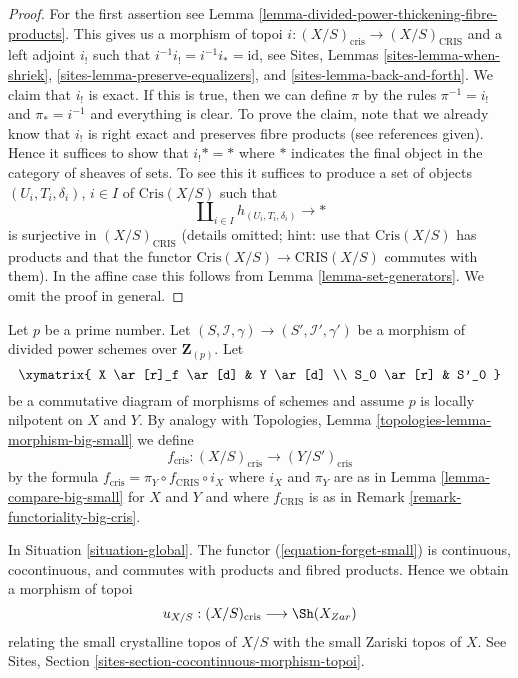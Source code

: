 \begin{proof}
For the first assertion see
Lemma \ref{lemma-divided-power-thickening-fibre-products}.
This gives us a morphism of topoi
$i : (X/S)_{\text{cris}} \to (X/S)_{\text{CRIS}}$ and a left adjoint
$i_!$ such that $i^{-1}i_! = i^{-1}i_* = \text{id}$, see
Sites, Lemmas \ref{sites-lemma-when-shriek},
\ref{sites-lemma-preserve-equalizers}, and
\ref{sites-lemma-back-and-forth}.
We claim that $i_!$ is exact. If this is true, then we can define
$\pi$ by the rules $\pi^{-1} = i_!$ and $\pi_* = i^{-1}$
and everything is clear. To prove the claim, note that we already know
that $i_!$ is right exact and preserves fibre products (see references
given). Hence it suffices to show that $i_! * = *$ where $*$ indicates
the final object in the category of sheaves of sets. 
To see this it suffices to produce a set of objects
$(U_i, T_i, \delta_i)$, $i \in I$ of $\text{Cris}(X/S)$ such that
$$
\coprod\nolimits_{i \in I} h_{(U_i, T_i, \delta_i)} \to *
$$
is surjective in $(X/S)_{\text{CRIS}}$ (details omitted; hint: use that
$\text{Cris}(X/S)$ has products and that the functor
$\text{Cris}(X/S) \to \text{CRIS}(X/S)$ commutes with them).
In the affine case this
follows from Lemma \ref{lemma-set-generators}. We omit the proof
in general.
\end{proof}

\begin{remark}[Functoriality]
\label{remark-functoriality-cris}
Let $p$ be a prime number.
Let $(S, \mathcal{I}, \gamma) \to (S', \mathcal{I}', \gamma')$
be a morphism of divided power schemes over $\mathbf{Z}_{(p)}$.
Let
$$
\xymatrix{
X \ar[r]_f \ar[d] & Y \ar[d] \\
S_0 \ar[r] & S'_0
}
$$
be a commutative diagram of morphisms of schemes and assume $p$ is
locally nilpotent on $X$ and $Y$. By analogy with
Topologies, Lemma \ref{topologies-lemma-morphism-big-small} we define
$$
f_{\text{cris}} : (X/S)_{\text{cris}} \longrightarrow (Y/S')_{\text{cris}}
$$
by the formula $f_{\text{cris}} = \pi_Y \circ f_{\text{CRIS}} \circ i_X$
where $i_X$ and $\pi_Y$ are as in Lemma \ref{lemma-compare-big-small}
for $X$ and $Y$ and where $f_{\text{CRIS}}$ is as in
Remark \ref{remark-functoriality-big-cris}.
\end{remark}

\begin{remark}
\label{remark-compare-zariski}
In Situation \ref{situation-global}.
The functor (\ref{equation-forget-small}) is continuous, cocontinuous, and
commutes with products and fibred products.
Hence we obtain a morphism of topoi
$$
u_{X/S} : (X/S)_{\text{cris}} \longrightarrow \Sh(X_{Zar})
$$
relating the small crystalline topos of $X/S$ with
the small Zariski topos of $X$.
See Sites, Section \ref{sites-section-cocontinuous-morphism-topoi}.
\end{remark}

